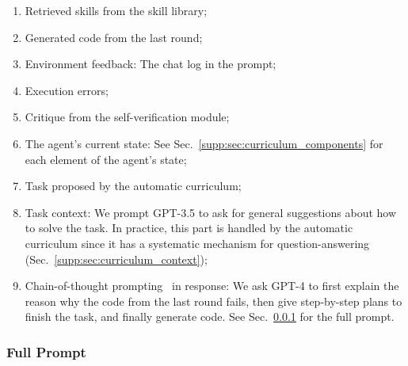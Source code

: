 \begin{enumerate}[label=(\arabic*)]
\begin{itemize}
        \item \texttt{await bot.lookAt(position)}: Look at the specified position. You must go near the position before you look at it. To fill a bucket with water, you must look at it first;
        \item \texttt{await bot.activateItem()}: This is the same as right-clicking to use the item in the bot's hand. Useful for using a bucket, etc. You must equip the item to activate first;
        \item \texttt{await bot.useOn(entity)}: This is the same as right-clicking an entity in the game. Useful for shearing a sheep. You must get to the entity first;
    \end{itemize}
    \item Retrieved skills from the skill library;
    \item Generated code from the last round;
    \item Environment feedback: The chat log in the prompt;
    \item Execution errors;
    \item Critique from the self-verification module;
    \item The agent's current state: See Sec.~\ref{supp:sec:curriculum_components} for each element of the agent's state;
    \item Task proposed by the automatic curriculum;
    \item Task context: We prompt GPT-3.5 to ask for general suggestions about how to solve the task. In practice, this part is handled by the automatic curriculum since it has a systematic mechanism for question-answering (Sec.~\ref{supp:sec:curriculum_context});
    \item Chain-of-thought prompting~\cite{wei2022chain} in response: We ask GPT-4 to first explain the reason why the code from the last round fails, then give step-by-step plans to finish the task, and finally generate code. See Sec.~\ref{supp:sec:skill_library_prompt} for the full prompt.
\end{enumerate}

\subsubsection{Full Prompt}
\label{supp:sec:skill_library_prompt}


